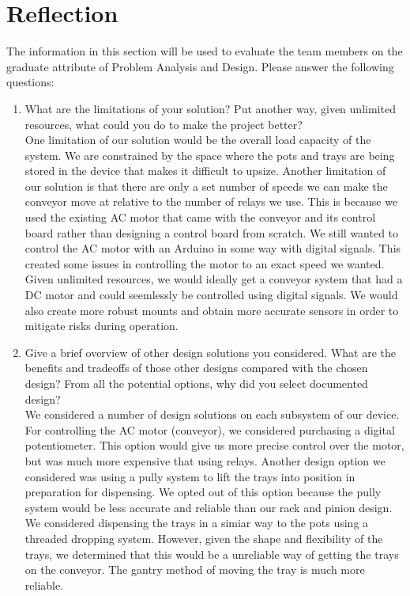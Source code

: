 \documentclass[12pt, titlepage]{article}
\begin{document}
\section{Reflection}

The information in this section will be used to evaluate the team members on the
graduate attribute of Problem Analysis and Design.  Please answer the following questions:

\begin{enumerate}
  \item What are the limitations of your solution?  Put another way, given
  unlimited resources, what could you do to make the project better?\\

  One limitation of our solution would be the overall load capacity of the system.
  We are constrained by the space where the pots and trays are being stored in the device
  that makes it difficult to upsize. Another limitation of our solution is that there are only
  a set number of speeds we can make the conveyor move at relative to the number of relays we use.
  This is because we used the existing AC motor that came with the conveyor and its control board rather than
  designing a control board from scratch. We still wanted to control the AC motor with an Arduino in some way with digital signals.
  This created some issues in controlling the motor to an exact speed we wanted. Given unlimited resources,
  we would ideally get a conveyor system that had a DC motor and could seemlessly be controlled using 
  digital signals. We would also create more robust mounts and obtain more accurate sensors in order to mitigate risks
  during operation.
  

  \item Give a brief overview of other design solutions you considered.  What
  are the benefits and tradeoffs of those other designs compared with the chosen
  design?  From all the potential options, why did you select documented design?\\
  
  We considered a number of design solutions on each subsystem of our device. For controlling the AC motor (conveyor),
  we considered purchasing a digital potentiometer. This option would give us more precise control over the motor, 
  but was much more expensive that using relays. Another design option we considered was using a pully system to lift the 
  trays into position in preparation for dispensing. We opted out of this option because the pully system would be less accurate and reliable
  than our rack and pinion design. We considered dispensing the trays in a simiar way to the pots using a threaded dropping system. However,
  given the shape and flexibility of the trays, we determined that this would be a unreliable way of getting the trays on the conveyor. The 
  gantry method of moving the tray is much more reliable.
\end{enumerate}
\end{document}
